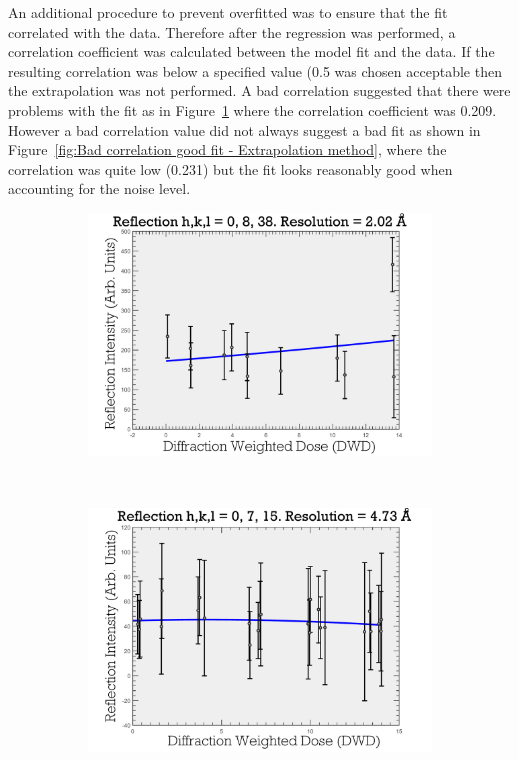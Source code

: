 An additional procedure to prevent overfitted was to ensure that the fit correlated with the data.
Therefore after the regression was performed, a correlation coefficient was calculated between the model fit and the data.
If the resulting correlation was below a specified value (0.5 was chosen acceptable then the extrapolation was not performed.
A bad correlation suggested that there were problems with the fit as in Figure~\ref{fig:Bad correlation bad fit - Extrapolation method} where the correlation coefficient was 0.209.
However a bad correlation value did not always suggest a bad fit as shown in Figure~\ref{fig:Bad correlation good fit - Extrapolation method}, where the correlation was  quite low (0.231) but the fit looks reasonably good when accounting for the noise level.
\begin{figure}
        \centering
        \begin{subfigure}[b]{1\textwidth}
                \centering
                \includegraphics[width=\textwidth]{figures/zde/ReflectionPlot_h,k,l_0,8,38-bad_corr_bad_fit.pdf}
                \caption{}
                \label{fig:Bad correlation bad fit - Extrapolation method}
        \end{subfigure}
				\\
        \begin{subfigure}[b]{1\textwidth}
                \centering
                \includegraphics[width=\textwidth]{figures/zde/ReflectionPlot_h,k,l_0,7,15-bad_corr_good_fit.pdf}

\end{subfigure}
\end{figure}
